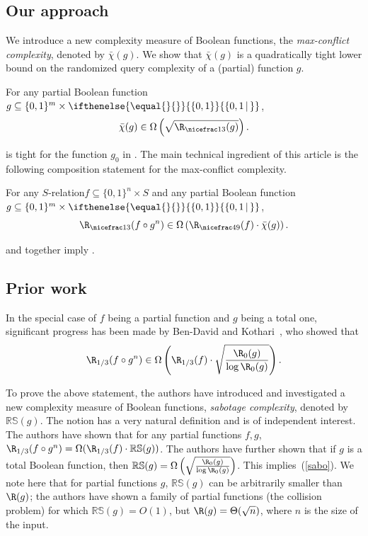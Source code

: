 \documentclass{toc}
\newcommand{\relation}{$S$-relation\xspace}     %
\newcommand{\md}{\middle}
\newcommand{\dr}{\nicefrac}
\newcommand{\set}[2][]{\ifthenelse{\equal{}{#1}}%
{\ensuremath{\left\{#2\right\}}}%
{\ensuremath{\left\{#2\,\md|\,#1\right\}}}}
\newcommand{\OI}{\set{0,1}}
\newcommand{\RS}{\mathbb{RS}}
\newcommand{\ccc}{max-conflict complexity}
\begin{document}
%
\subsection{Our approach} %

We introduce a new complexity measure of Boolean functions, the \emph{\ccc}, denoted by $\bar \chi(g)$.
We show that $\bar \chi(g)$ is a quadratically tight lower bound on
the  %
randomized query complexity of a (partial) function $g$.

\begin{theorem}
\label{thm:maxquad}
For any partial Boolean function
%
$g\subseteq \{0,1\}^m \times \OI$,
\[\bar \chi(g)\in\Omega\left(\sqrt{\R_{\dr13}(g)}\right).\]
\end{theorem}

 is tight for the function $g_0$ in . The main technical ingredient of this 
%
%
article  %
is the following composition statement for the \ccc.

\begin{theorem}
\label{main}
For any \relation $f \subseteq \{0,1\}^n \times S$ and any partial Boolean function
%
$g\subseteq \{0,1\}^m \times \OI$,
\[\R_{\dr13}(f \circ g^n) \in \Omega\left(\R_{\dr49}(f) \cdot \bar \chi(g)\right).\]
\end{theorem}

 and  together imply .

%
\subsection{Prior work}  %

In the special case of $f$ being a partial function and $g$ being a total one, significant progress has been made by Ben-David and Kothari~\cite{DBLP:conf/icalp/Ben-DavidK16}, who showed that
\begin{align}
	\R_{1/3}(f \circ g^n) \in 
	 \Omega \left(\R_{1/3}(f) \cdot \sqrt{\frac{\R_0(g)}{\log \R_0(g)}}\right).\label{sabo}
\end{align}

To prove the above statement, the authors have introduced and investigated a new complexity measure of Boolean functions, \emph{sabotage complexity}, denoted by $\RS(g)$. The notion has a very natural definition and is of independent interest. The authors have shown that for any partial functions $f,g$, $\R_{1/3}(f \circ g^n)=\Omega(\R_{1/3}(f) \cdot \RS(g))$. The authors have further shown that if $g$ is a total Boolean function, then $\RS(g)=\Omega\left(\sqrt{\frac{\R_0(g)}{\log \R_0(g)}}\right)$. This implies~(\ref{sabo}). We note here that for partial functions $g$, $\RS(g)$ can be arbitrarily smaller than $\R(g)$; the authors have shown a family of partial functions (the collision problem) for which $\RS(g)=O(1)$, but $\R(g)=\Theta(\sqrt{n})$, where $n$ is the size of the input.
\end{document}
